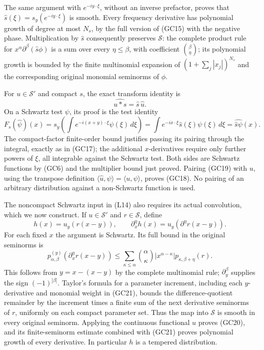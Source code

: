 \documentclass[
  11pt,
]{article}
\begin{document}
The same argument with \(e^{-iy\cdot\xi}\), without an inverse
prefactor, proves that \(\widehat s(\xi)=s_y(e^{-iy\cdot\xi})\) is
smooth. Every frequency derivative has polynomial growth of degree at
most \(N_s\), by the full version of (GC15) with the negative phase.
Multiplication by \(\widehat s\) consequently preserves \(\mathcal S\):
the complete product rule for \(x^\alpha\partial^\beta(\widehat s\phi)\)
is a sum over every \(\eta\leq\beta\), with coefficient
\(\binom{\beta}{\eta}\); its polynomial growth is bounded by the finite
multinomial expansion of \((1+\sum_j|x_j|)^{N_s}\) and the corresponding
original monomial seminorms of \(\phi\).

For \(u\in\mathcal S'\) and compact \(s\), the exact transform identity
is \[
 \widehat{u*s}=\widehat s\,\widehat u.
 \tag{GC18}
\] On a Schwartz test \(\psi\), its proof is the test identity \[
 F_s(\widehat\psi)(x)
   =s_y\left(\int e^{-i(x+y)\cdot\xi}\psi(\xi)\,d\xi\right)
   =\int e^{-ix\cdot\xi}\widehat s(\xi)\psi(\xi)\,d\xi
   =\widehat{\widehat s\psi}(x).
 \tag{GC19}
\] The compact-factor finite-order bound justifies passing its pairing
through the integral, exactly as in (GC17); the additional
\(x\)-derivatives require only further powers of \(\xi\), all integrable
against the Schwartz test. Both sides are Schwartz functions by (GC6)
and the multiplier bound just proved. Pairing (GC19) with \(u\), using
the transpose definition
\(\langle\widehat u,\psi\rangle=\langle u,\widehat\psi\rangle\), proves
(GC18). No pairing of an arbitrary distribution against a non-Schwartz
function is used.

The noncompact Schwartz input in (L14) also requires its actual
convolution, which we now construct. If \(u\in\mathcal S'\) and
\(r\in\mathcal S\), define \[
 h(x)=u_y(r(x-y)),\qquad
 \partial_x^\eta h(x)=u_y(\partial^\eta r(x-y)).
 \tag{GC20}
\] For each fixed \(x\) the argument is Schwartz. Its full bound in the
original seminorms is \[
 p_{\alpha,\beta}^{(y)}(\partial_x^\eta r(x-y))
 \leq\sum_{\kappa\leq\alpha}\binom{\alpha}{\kappa}
       |x^{\alpha-\kappa}|p_{\kappa,\beta+\eta}(r).
 \tag{GC21}
\] This follows from \(y=x-(x-y)\) by the complete multinomial rule;
\(\partial_y^\beta\) supplies the sign \((-1)^{|\beta|}\). Taylor's
formula for a parameter increment, including each \(y\)-derivative and
monomial weight in (GC21), bounds the difference-quotient remainder by
the increment times a finite sum of the next derivative seminorms of
\(r\), uniformly on each compact parameter set. Thus the map into
\(\mathcal S\) is smooth in every original seminorm. Applying the
continuous functional \(u\) proves (GC20), and its finite-seminorm
estimate combined with (GC21) proves polynomial growth of every
derivative. In particular \(h\) is a tempered distribution.
\end{document}

